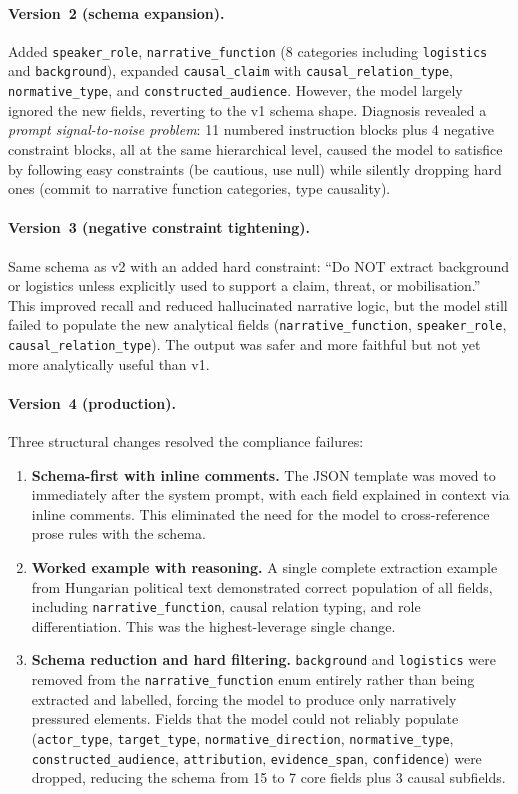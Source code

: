\documentclass[10pt, a4paper]{article}
\begin{document}
\paragraph{Version~2 (schema expansion).}
Added \texttt{speaker\_role}, \texttt{narrative\_function} (8 categories including \texttt{logistics} and \texttt{background}), expanded \texttt{causal\_claim} with \texttt{causal\_relation\_type}, \texttt{normative\_type}, and \texttt{constructed\_audience}. However, the model largely ignored the new fields, reverting to the v1 schema shape. Diagnosis revealed a \emph{prompt signal-to-noise problem}: 11 numbered instruction blocks plus 4 negative constraint blocks, all at the same hierarchical level, caused the model to satisfice by following easy constraints (be cautious, use null) while silently dropping hard ones (commit to narrative function categories, type causality).

\paragraph{Version~3 (negative constraint tightening).}
Same schema as v2 with an added hard constraint: ``Do NOT extract background or logistics unless explicitly used to support a claim, threat, or mobilisation.'' This improved recall and reduced hallucinated narrative logic, but the model still failed to populate the new analytical fields (\texttt{narrative\_function}, \texttt{speaker\_role}, \texttt{causal\_relation\_type}). The output was safer and more faithful but not yet more analytically useful than v1.

\paragraph{Version~4 (production).}
Three structural changes resolved the compliance failures:

\begin{enumerate}
\item \textbf{Schema-first with inline comments.} The JSON template was moved to immediately after the system prompt, with each field explained in context via inline comments. This eliminated the need for the model to cross-reference prose rules with the schema.
\item \textbf{Worked example with reasoning.} A single complete extraction example from Hungarian political text demonstrated correct population of all fields, including \texttt{narrative\_function}, causal relation typing, and role differentiation. This was the highest-leverage single change.
\item \textbf{Schema reduction and hard filtering.} \texttt{background} and \texttt{logistics} were removed from the \texttt{narrative\_function} enum entirely rather than being extracted and labelled, forcing the model to produce only narratively pressured elements. Fields that the model could not reliably populate (\texttt{actor\_type}, \texttt{target\_type}, \texttt{normative\_direction}, \texttt{normative\_type}, \texttt{constructed\_audience}, \texttt{attribution}, \texttt{evidence\_span}, \texttt{confidence}) were dropped, reducing the schema from 15 to 7 core fields plus 3 causal subfields.
\end{enumerate}
\end{document}
